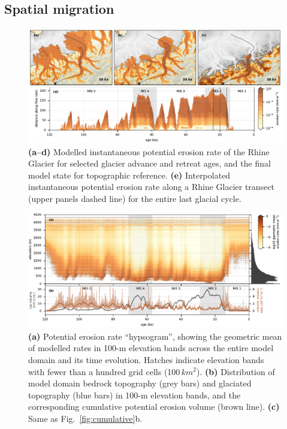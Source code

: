 \documentclass[esurf, manuscript]{copernicus}
\begin{document}
\subsection{Spatial migration}

    \begin{figure}
      \centerline{\includegraphics{alpero_transects}}
      \caption{%
        \textbf{(a--d)} Modelled instantaneous potential erosion rate of the
          Rhine Glacier for selected glacier advance and retreat ages, and the
          final model state for topographic reference.
        \textbf{(e)} Interpolated instantaneous potential erosion rate along a
          Rhine Glacier transect (upper panels dashed line) for the entire last
          glacial cycle.}
      \label{fig:transects}
    \end{figure}

    \begin{figure}
      \centerline{\includegraphics{alpero_hypsogram}}
      \caption{%
        \textbf{(a)} Potential erosion rate ``hypsogram'', showing the
          geometric mean of modelled rates in 100-m elevation bands
          across the entire model domain and its time evolution. Hatches
          indicate elevation bands with fewer than a hundred grid cells
          (100\,$km^2$).
        \textbf{(b)} Distribution of model domain bedrock topography (grey
          bars) and glaciated topography (blue bars) in 100-m elevation bands,
          and the corresponding cumulative potential erosion volume (brown
          line).
        \textbf{(c)} Same as Fig.~\ref{fig:cumulative}b.}
      \label{fig:hypsogram}

    \end{figure}
\end{document}
